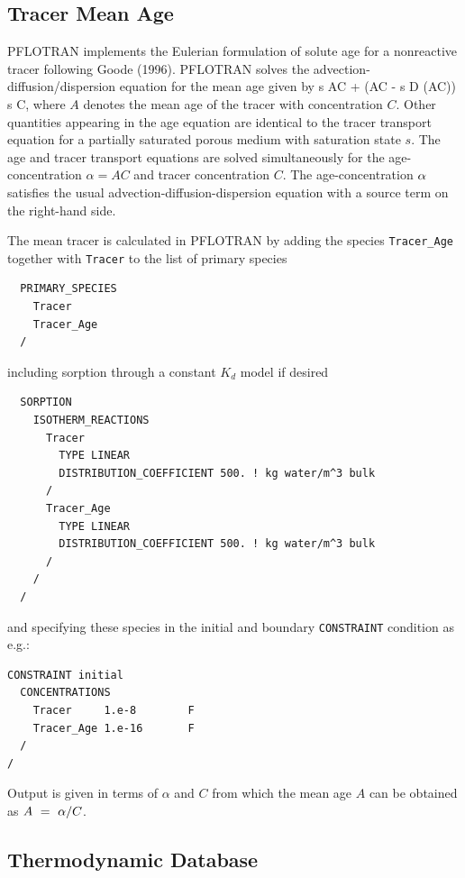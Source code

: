 \subsection{Tracer Mean Age}

PFLOTRAN implements the Eulerian formulation of solute age for a nonreactive tracer following Goode (1996). PFLOTRAN solves the advection-diffusion/dispersion equation for the mean age given by
\EQ
{} \varphi s AC + \bnabla\cdot\Big(\bq AC - \varphi s D \bnabla (AC)\Big) \eq \varphi s C,
\EN
where $A$ denotes the mean age of the tracer with concentration $C$. Other quantities appearing in the age equation are identical to the tracer transport equation for a partially saturated porous medium with saturation state $s$. The age and tracer transport equations are solved simultaneously for the age-concentration $\alpha = A C$ and tracer concentration $C$. The age-concentration ${\alpha}$ satisfies the usual advection-diffusion-dispersion equation with a source term on the right-hand side.

The mean tracer is calculated in PFLOTRAN by adding the species {\tt Tracer\_Age} together with {\tt Tracer} to the list of primary species
\footnotesize
\begin{verbatim}
  PRIMARY_SPECIES
    Tracer
    Tracer_Age
  /
\end{verbatim}
\normalsize
including sorption through a constant $K_d$ model if desired
\footnotesize
\begin{verbatim}
  SORPTION
    ISOTHERM_REACTIONS
      Tracer
        TYPE LINEAR 
        DISTRIBUTION_COEFFICIENT 500. ! kg water/m^3 bulk
      /
      Tracer_Age
        TYPE LINEAR 
        DISTRIBUTION_COEFFICIENT 500. ! kg water/m^3 bulk
      /
    /
  /
\end{verbatim}
\normalsize
and specifying these species in the initial and boundary {\tt CONSTRAINT} condition as e.g.:
\footnotesize
\begin{verbatim}
CONSTRAINT initial
  CONCENTRATIONS
    Tracer     1.e-8        F
    Tracer_Age 1.e-16       F
  /
/
\end{verbatim}
\normalsize
Output is given in terms of $\alpha$ and $C$ from which the mean age $A$ can be obtained as $A\ =\ \alpha/C$. 

\subsection{Thermodynamic Database}
\label{thermo:database}

